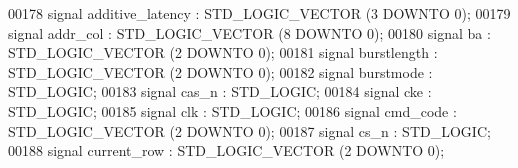 \begin{DoxyCode}
00178                 \textcolor{keywordflow}{signal} \textcolor{vhdlchar}{additive_latency} \textcolor{vhdlchar}{:}  \textcolor{comment}{STD\_LOGIC\_VECTOR} \textcolor{vhdlchar}{(}\textcolor{vhdllogic}{}\textcolor{vhdllogic}{3} \textcolor{keywordflow}{DOWNTO} \textcolor{vhdllogic}{}\textcolor{vhdllogic}{0}\textcolor{vhdlchar}{)};
00179                 \textcolor{keywordflow}{signal} \textcolor{vhdlchar}{addr_col} \textcolor{vhdlchar}{:}  \textcolor{comment}{STD\_LOGIC\_VECTOR} \textcolor{vhdlchar}{(}\textcolor{vhdllogic}{}\textcolor{vhdllogic}{8} \textcolor{keywordflow}{DOWNTO} \textcolor{vhdllogic}{}\textcolor{vhdllogic}{0}\textcolor{vhdlchar}{)};
00180                 \textcolor{keywordflow}{signal} \textcolor{vhdlchar}{ba} \textcolor{vhdlchar}{:}  \textcolor{comment}{STD\_LOGIC\_VECTOR} \textcolor{vhdlchar}{(}\textcolor{vhdllogic}{}\textcolor{vhdllogic}{2} \textcolor{keywordflow}{DOWNTO} \textcolor{vhdllogic}{}\textcolor{vhdllogic}{0}\textcolor{vhdlchar}{)};
00181                 \textcolor{keywordflow}{signal} \textcolor{vhdlchar}{burstlength} \textcolor{vhdlchar}{:}  \textcolor{comment}{STD\_LOGIC\_VECTOR} \textcolor{vhdlchar}{(}\textcolor{vhdllogic}{}\textcolor{vhdllogic}{2} \textcolor{keywordflow}{DOWNTO} \textcolor{vhdllogic}{}\textcolor{vhdllogic}{0}\textcolor{vhdlchar}{)};
00182                 \textcolor{keywordflow}{signal} \textcolor{vhdlchar}{burstmode} \textcolor{vhdlchar}{:}  \textcolor{comment}{STD\_LOGIC};
00183                 \textcolor{keywordflow}{signal} \textcolor{vhdlchar}{cas_n} \textcolor{vhdlchar}{:}  \textcolor{comment}{STD\_LOGIC};
00184                 \textcolor{keywordflow}{signal} \textcolor{vhdlchar}{cke} \textcolor{vhdlchar}{:}  \textcolor{comment}{STD\_LOGIC};
00185                 \textcolor{keywordflow}{signal} \textcolor{vhdlchar}{clk} \textcolor{vhdlchar}{:}  \textcolor{comment}{STD\_LOGIC};
00186                 \textcolor{keywordflow}{signal} \textcolor{vhdlchar}{cmd_code} \textcolor{vhdlchar}{:}  \textcolor{comment}{STD\_LOGIC\_VECTOR} \textcolor{vhdlchar}{(}\textcolor{vhdllogic}{}\textcolor{vhdllogic}{2} \textcolor{keywordflow}{DOWNTO} \textcolor{vhdllogic}{}\textcolor{vhdllogic}{0}\textcolor{vhdlchar}{)};
00187                 \textcolor{keywordflow}{signal} \textcolor{vhdlchar}{cs_n} \textcolor{vhdlchar}{:}  \textcolor{comment}{STD\_LOGIC};
00188                 \textcolor{keywordflow}{signal} \textcolor{vhdlchar}{current_row} \textcolor{vhdlchar}{:}  \textcolor{comment}{STD\_LOGIC\_VECTOR} \textcolor{vhdlchar}{(}\textcolor{vhdllogic}{}\textcolor{vhdllogic}{2} \textcolor{keywordflow}{DOWNTO} \textcolor{vhdllogic}{}\textcolor{vhdllogic}{0}\textcolor{vhdlchar}{)};

\end{DoxyCode}
